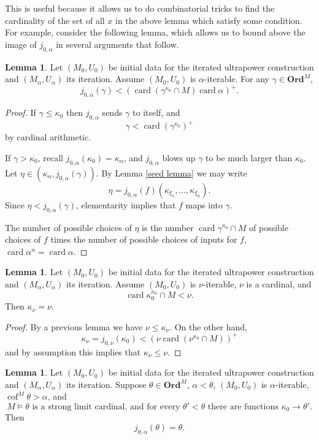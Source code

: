 \documentclass[12pt]{report}
\newcommand{\card}{\operatorname{card}}
\newcommand{\Ord}{\mathbf{Ord}}
\DeclareMathOperator{\cof}{cof}
\theoremstyle{definition}
\newtheorem{lemma}[theorem]{Lemma}
\begin{document}
This is useful because it allows us to do combinatorial tricks to find the cardinality of the set of all $x$ in the above lemma which satisfy some condition. For example, consider the following lemma, which allows us to bound above the image of $j_{0,\alpha}$ in several arguments that follow.
\begin{lemma}
Let $(M_0, U_0)$ be initial data for the iterated ultrapower construction and $(M_\alpha, U_\alpha)$ its iteration.
Assume $(M_0, U_0)$ is $\alpha$-iterable.
For any $\gamma \in \Ord^M$,
$$j_{0,\alpha}(\gamma) < (\card (\gamma^{\kappa_0}\cap M) \card \alpha)^+.$$
\end{lemma}
\begin{proof}
If $\gamma \leq \kappa_0$ then $j_{0,\alpha}$ sends $\gamma$ to itself, and
$$\gamma < \card (\gamma^{\kappa_0})^+$$
by cardinal arithmetic.

If $\gamma > \kappa_0$, recall $j_{0,\alpha}(\kappa_0) = \kappa_\alpha$, and $j_{0,\alpha}$ blows up $\gamma$ to be much larger than $\kappa_0$.
Let $\eta \in (\kappa_\alpha, j_{0,\alpha}(\gamma))$. By Lemma \ref{seed lemma} we may write
$$\eta = j_{0,\alpha}(f)(\kappa_{\xi_1}, \dots, \kappa_{\xi_n}).$$
Since $\eta < j_{0,\alpha}(\gamma)$, elementarity implies that $f$ maps into $\gamma$.

The number of possible choices of $\eta$ is the number $\card \gamma^{\kappa_0} \cap M$ of possible choices of $f$ times the number of possible choices of inputs for $f$, $\card \alpha^n = \card \alpha$.
\end{proof}
\begin{lemma}
Let $(M_0, U_0)$ be initial data for the iterated ultrapower construction and $(M_\alpha, U_\alpha)$ its iteration.
Assume $(M_0, U_0)$ is $\nu$-iterable, $\nu$ is a cardinal, and
$$\card \kappa_0^{\kappa_0} \cap M < \nu.$$
Then $\kappa_\nu = \nu$.
\end{lemma}
\begin{proof}
By a previous lemma we have $\nu \leq \kappa_\nu$. On the other hand,
$$\kappa_\nu = j_{0,\nu}(\kappa_0) < (\nu \card(\nu^{\kappa_0} \cap M))^+$$
and by assumption this implies that $\kappa_\nu \leq \nu$.
\end{proof}
\begin{lemma}
Let $(M_0, U_0)$ be initial data for the iterated ultrapower construction and $(M_\alpha, U_\alpha)$ its iteration.
Suppose $\theta \in \Ord^M$, $\alpha < \theta$, $(M_0, U_0)$ is $\alpha$-iterable, $\cof^M\theta >\alpha$, and
$$M \models \text{$\theta$ is a strong limit cardinal, and for every $\theta' < \theta$ there are functions $\kappa_0 \to \theta'$.}$$
Then
$$j_{0,\alpha}(\theta) = \theta.$$
\end{lemma}
\end{document}
